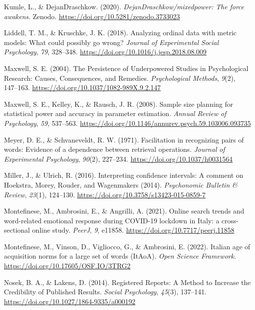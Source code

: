 \documentclass[
  man]{apa7}
\newlength{\cslhangindent}
\newenvironment{CSLReferences}[2] %
 {\begin{list}{}{%
  \setlength{\itemindent}{0pt}
  \setlength{\leftmargin}{0pt}
  \setlength{\parsep}{0pt}
  \ifodd #1
   \setlength{\leftmargin}{\cslhangindent}
   \setlength{\itemindent}{-1\cslhangindent}
  \fi
  \setlength{\itemsep}{#2\baselineskip}}}
 {\end{list}}
\begin{document}
\begin{CSLReferences}{1}{0}
Kumle, L., \& DejanDraschkow. (2020). \emph{DejanDraschkow/mixedpower: The force awakens}. Zenodo. \url{https://doi.org/10.5281/zenodo.3733023}

Liddell, T. M., \& Kruschke, J. K. (2018). Analyzing ordinal data with metric models: What could possibly go wrong? \emph{Journal of Experimental Social Psychology}, \emph{79}, 328--348. \url{https://doi.org/10.1016/j.jesp.2018.08.009}

Maxwell, S. E. (2004). The Persistence of Underpowered Studies in Psychological Research: Causes, Consequences, and Remedies. \emph{Psychological Methods}, \emph{9}(2), 147--163. \url{https://doi.org/10.1037/1082-989X.9.2.147}

Maxwell, S. E., Kelley, K., \& Rausch, J. R. (2008). Sample size planning for statistical power and accuracy in parameter estimation. \emph{Annual Review of Psychology}, \emph{59}, 537--563. \url{https://doi.org/10.1146/annurev.psych.59.103006.093735}

Meyer, D. E., \& Schvaneveldt, R. W. (1971). Facilitation in recognizing pairs of words: Evidence of a dependence between retrieval operations. \emph{Journal of Experimental Psychology}, \emph{90}(2), 227--234. \url{https://doi.org/10.1037/h0031564}

Miller, J., \& Ulrich, R. (2016). Interpreting confidence intervals: A comment on Hoekstra, Morey, Rouder, and Wagenmakers (2014). \emph{Psychonomic Bulletin \& Review}, \emph{23}(1), 124--130. \url{https://doi.org/10.3758/s13423-015-0859-7}

Montefinese, M., Ambrosini, E., \& Angrilli, A. (2021). Online search trends and word-related emotional response during COVID-19 lockdown in Italy: a cross-sectional online study. \emph{PeerJ}, \emph{9}, e11858. \url{https://doi.org/10.7717/peerj.11858}

Montefinese, M., Vinson, D., Vigliocco, G., \& Ambrosini, E. (2022). Italian age of acquisition norms for a large set of words (ItAoA). \emph{Open Science Framework}. \url{https://doi.org/10.17605/OSF.IO/3TRG2}

Nosek, B. A., \& Lakens, D. (2014). Registered Reports: A Method to Increase the Credibility of Published Results. \emph{Social Psychology}, \emph{45}(3), 137--141. \url{https://doi.org/10.1027/1864-9335/a000192}


\end{CSLReferences}
\end{document}
